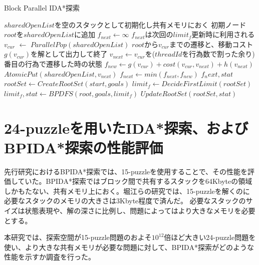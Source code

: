 \documentclass[a4paper,11pt,oneside,openany]{jsbook}
\begin{document}
\newpage
\begin{algorithm}
\caption{Block Parallel IDA*探索}
\label{alg:pbnf}
\begin{algorithmic}[1]
    \State $sharedOpenList$を空のスタックとして初期化し共有メモリにおく
    \State 初期ノード$root$を$sharedOpenList$に追加
    \State $f_{next} \leftarrow \infty$
    \State $f_{next}$は次回の$limit_f$更新時に利用される 
        \State $v_{cur}$ $\leftarrow$ ${ParallelPop}(sharedOpenList)$
            \State $root$から$v_{cur}$までの遷移と、移動コスト$g(v_{cur})$を解として出力して終了
        \EndIf
        \State $v_{next} \gets $$v_{cur}$を($threadId$を行為数で割った余り)番目の行為で遷移した時の状態
        \State $f_{new} \leftarrow g(v_{cur}) + cost(v_{cur}, v_{next}) + h(v_{next})$
            \State ${AtomicPut}(sharedOpenList, v_{next})$ 
        \Else
            \State $f_{next} \leftarrow min(f_{next}, f_{new})$
        \EndIf
    \EndWhile
    \State \Return $f_next, stat$
\EndFunction
{}
    \State $rootSet \gets {CreateRootSet}(start, goals)$
    \State $limit_f \leftarrow {DecideFirstLimit}(rootSet)$
            \State $limit_f, stat \gets {BPDFS}(root, goals, limit_f)$
        \EndParallelForByBlocks
        \State $UpdateRootSet(rootSet, stat)$
    \EndWhile
\EndFunction

\end{algorithmic}
\end{algorithm}
\newpage

\section{24-puzzleを用いたIDA*探索、およびBPIDA*探索の性能評価}
先行研究におけるBPIDA*探索\cite{HA17}では、15-puzzleを使用することで、その性能を評価していた。BPIDA*探索ではブロック間で共有するスタックを64Kbyteの領域しかもたない、共有メモリ上におく。堀江らの研究では、15-puzzleを解くのに必要なスタックのメモリの大きさは3Kbyte程度で済んだ。
必要なスタックのサイズは状態表現や、解の深さに比例し、問題によってはより大きなメモリを必要とする。

本研究では、探索空間が15-puzzle問題のおよそ$10^12$倍ほど大きい24-puzzle問題を使い、より大きな共有メモリが必要な問題に対して、BPIDA*探索がどのような性能を示すか調査を行った。
\end{document}
